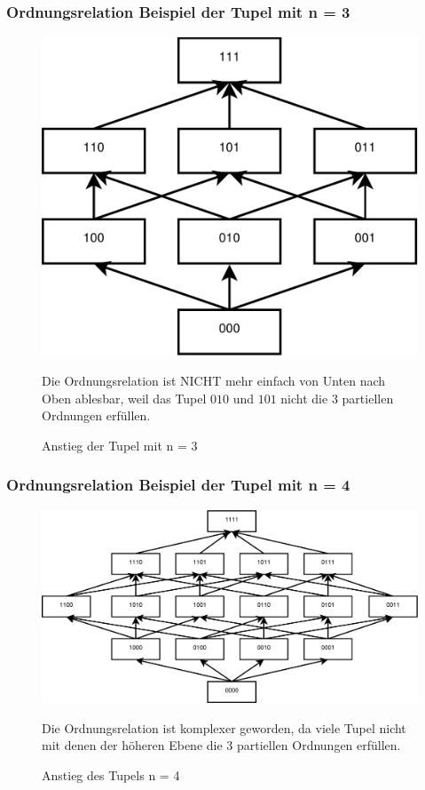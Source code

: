 \documentclass[hyperref={pdfpagelabels=false}]{beamer} %
\begin{document}
  \subsubsection*{Ordnungsrelation Beispiel der Tupel mit n = 3}
  \begin{frame}
    \begin{figure}
      \includegraphics[scale=0.30]{images/m3.pdf}
      \caption{Anstieg der Tupel mit n = 3}
      Die Ordnungsrelation ist NICHT mehr einfach von Unten nach Oben ablesbar, weil das Tupel $010$ und $101$ nicht die 3 partiellen Ordnungen erfüllen.
    \end{figure}
  \end{frame}

  \subsubsection*{Ordnungsrelation Beispiel der Tupel mit n = 4}
  \begin{frame}
    \begin{figure}
      \includegraphics[scale=0.30]{images/m4.pdf}
      \caption{Anstieg des Tupels n = 4}
      Die Ordnungsrelation ist komplexer geworden, da viele Tupel nicht mit denen der höheren Ebene die 3 partiellen Ordnungen erfüllen.
    \end{figure}
  \end{frame}
\end{document}
